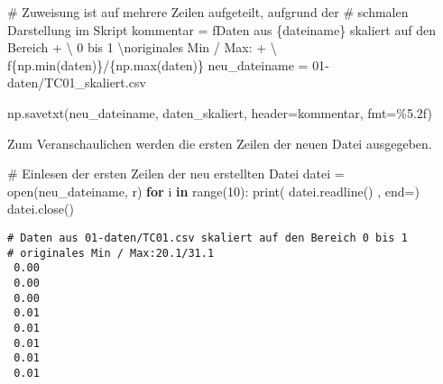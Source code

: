 \documentclass[
  letterpaper,
  DIV=11,
  numbers=noendperiod]{scrreprt}
\newenvironment{Shaded}{\begin{snugshade}}{\end{snugshade}}
\newcommand{\BuiltInTok}[1]{\textcolor[rgb]{0.00,0.23,0.31}{#1}}
\newcommand{\CharTok}[1]{\textcolor[rgb]{0.13,0.47,0.30}{#1}}
\newcommand{\CommentTok}[1]{\textcolor[rgb]{0.37,0.37,0.37}{#1}}
\newcommand{\ControlFlowTok}[1]{\textcolor[rgb]{0.00,0.23,0.31}{\textbf{#1}}}
\newcommand{\DecValTok}[1]{\textcolor[rgb]{0.68,0.00,0.00}{#1}}
\newcommand{\KeywordTok}[1]{\textcolor[rgb]{0.00,0.23,0.31}{\textbf{#1}}}
\newcommand{\NormalTok}[1]{\textcolor[rgb]{0.00,0.23,0.31}{#1}}
\newcommand{\OperatorTok}[1]{\textcolor[rgb]{0.37,0.37,0.37}{#1}}
\newcommand{\SpecialCharTok}[1]{\textcolor[rgb]{0.37,0.37,0.37}{#1}}
\newcommand{\SpecialStringTok}[1]{\textcolor[rgb]{0.13,0.47,0.30}{#1}}
\newcommand{\StringTok}[1]{\textcolor[rgb]{0.13,0.47,0.30}{#1}}
\begin{document}
\begin{tcolorbox}
\begin{Shaded}
\begin{Highlighting}[]
\CommentTok{\# Zuweisung ist auf mehrere Zeilen aufgeteilt, aufgrund der }
\CommentTok{\# schmalen Darstellung im Skript}
\NormalTok{kommentar }\OperatorTok{=} \SpecialStringTok{f\textquotesingle{}Daten aus }\SpecialCharTok{\{}\NormalTok{dateiname}\SpecialCharTok{\}}\SpecialStringTok{ skaliert auf den Bereich \textquotesingle{}} \OperatorTok{+} \OperatorTok{\textbackslash{}}
             \StringTok{\textquotesingle{}0 bis 1 }\CharTok{\textbackslash{}n}\StringTok{originales Min / Max:\textquotesingle{}} \OperatorTok{+} \OperatorTok{\textbackslash{}}
            \SpecialStringTok{f\textquotesingle{}}\SpecialCharTok{\{}\NormalTok{np}\SpecialCharTok{.}\BuiltInTok{min}\NormalTok{(daten)}\SpecialCharTok{\}}\SpecialStringTok{/}\SpecialCharTok{\{}\NormalTok{np}\SpecialCharTok{.}\BuiltInTok{max}\NormalTok{(daten)}\SpecialCharTok{\}}\SpecialStringTok{\textquotesingle{}}
\NormalTok{neu\_dateiname }\OperatorTok{=} \StringTok{\textquotesingle{}01{-}daten/TC01\_skaliert.csv\textquotesingle{}}

\NormalTok{np.savetxt(neu\_dateiname, daten\_skaliert, }
\NormalTok{           header}\OperatorTok{=}\NormalTok{kommentar, fmt}\OperatorTok{=}\StringTok{\textquotesingle{}}\SpecialCharTok{\%5.2f}\StringTok{\textquotesingle{}}\NormalTok{)}
\end{Highlighting}
\end{Shaded}

Zum Veranschaulichen werden die ersten Zeilen der neuen Datei
ausgegeben.

\begin{Shaded}
\begin{Highlighting}[]
\CommentTok{\# Einlesen der ersten Zeilen der neu erstellten Datei}
\NormalTok{datei }\OperatorTok{=} \BuiltInTok{open}\NormalTok{(neu\_dateiname, }\StringTok{\textquotesingle{}r\textquotesingle{}}\NormalTok{)}
\ControlFlowTok{for}\NormalTok{ i }\KeywordTok{in} \BuiltInTok{range}\NormalTok{(}\DecValTok{10}\NormalTok{):}
    \BuiltInTok{print}\NormalTok{( datei.readline() , end}\OperatorTok{=}\StringTok{\textquotesingle{}\textquotesingle{}}\NormalTok{)}
\NormalTok{datei.close()}
\end{Highlighting}
\end{Shaded}

\begin{verbatim}
# Daten aus 01-daten/TC01.csv skaliert auf den Bereich 0 bis 1 
# originales Min / Max:20.1/31.1
 0.00
 0.00
 0.00
 0.01
 0.01
 0.01
 0.01
 0.01
\end{verbatim}


\end{tcolorbox}
\end{document}
